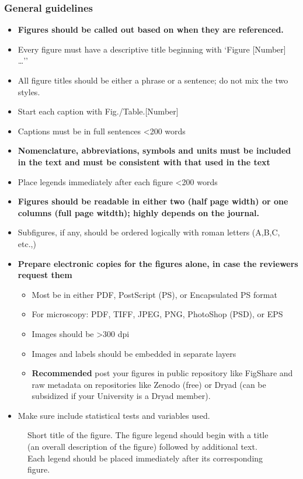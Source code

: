 \documentclass{article}
\begin{document}
	\subsubsection*{General guidelines}
	\begin{itemize}
		\item \textbf{Figures should be called out based on when they are referenced.}
		\item Every figure must have a descriptive title beginning with `Figure [Number] …''
		\item All figure titles should be either a phrase or a sentence; do not mix the two styles.
		\item Start each caption with Fig./Table.[Number]
		\item Captions must be in full sentences \textless 200 words
		\item \textbf{Nomenclature, abbreviations, symbols and units must be included in the text and must be consistent with that used in the text}
		\item Place legends immediately after each figure \textless 200 words 
		\item \textbf{Figures should be readable in either two (half page width) or one columns (full page witdth); highly depends on the journal. }
		\item Subfigures, if any, should be ordered logically with roman letters (A,B,C, etc.,)
		\item \textbf{Prepare electronic copies for the figures alone, in case the reviewers request them}
		\begin{itemize}
			\item Most be in either PDF, PostScript (PS), or Encapsulated PS format
			\item For microscopy: PDF, TIFF, JPEG, PNG, PhotoShop (PSD), or EPS
			\item Images should be \textgreater 300 dpi
			\item Images and labels should be embedded in separate layers
			\item \textbf{Recommended} post your figures in public repository like FigShare and raw metadata on repositories like Zenodo (free) or Dryad (can be subsidized if your University is a Dryad member).
		\end{itemize}
		\item Make sure include statistical tests and variables used.
	\end{itemize}
	
	\begin{figure}[h]
		\centering
		\caption{Short title of the figure. The figure legend should begin with a title (an overall description of the figure) followed by additional text. Each legend should be placed immediately after its corresponding figure.}
		\label{fig:1}
	\end{figure}
	
\end{document}
